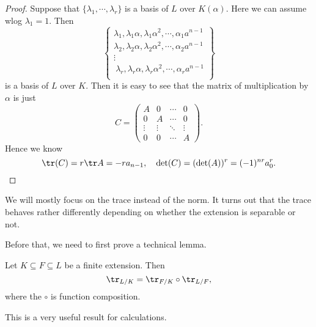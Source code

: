 \documentclass[a4paper]{article}
\begin{document}
\begin{proof}
  Suppose that $\{\lambda_1, \cdots, \lambda_r\}$ is a basis of $L$ over $K(\alpha)$. Here we can assume wlog $\lambda_1 = 1$. Then
  \[
    \left\{
      \begin{array}{c}
        \lambda_1, \lambda_1 \alpha, \lambda_1 \alpha^2, \cdots, \alpha_1 a^{n - 1}\\
        \lambda_2, \lambda_2 \alpha, \lambda_2 \alpha^2, \cdots, \alpha_2 a^{n - 1}\\
        \vdots\\\
        \lambda_r, \lambda_r \alpha, \lambda_r \alpha^2, \cdots, \alpha_r a^{n - 1}\\
      \end{array}
    \right\}
  \]
  is a basis of $L$ over $K$. Then it is easy to see that the matrix of multiplication by $\alpha$ is just
  \[
    C = \begin{pmatrix}
      A & 0 & \cdots & 0\\
      0 & A & \cdots & 0\\
      \vdots & \vdots & \ddots & \vdots\\
      0 & 0 & \cdots & A
    \end{pmatrix}.
  \]
  Hence we know
  \[
    \tr (C) = r \tr A = - r a_{n - 1},\quad \det (C) = (\det (A))^r = (-1)^{nr} a_0^r.
  \]
\end{proof}
We will mostly focus on the trace instead of the norm. It turns out that the trace behaves rather differently depending on whether the extension is separable or not.

Before that, we need to first prove a technical lemma.
\begin{lemma}
  Let $K \subseteq F \subseteq L$ be a finite extension. Then
  \[
    \tr_{L/K} = \tr_{F/K} \circ \tr_{L/F},
  \]
  where the $\circ$ is function composition.
\end{lemma}
This is a very useful result for calculations.
\end{document}

